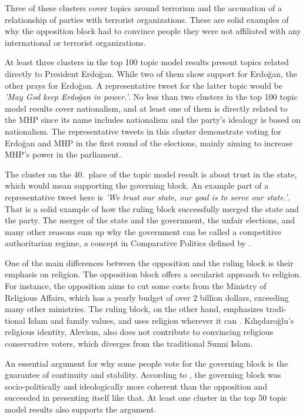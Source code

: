 Three of these clusters cover topics around terrorism and the accusation of a relationship of parties 
with terrorist organizations. These are solid examples of why the opposition block had to convince 
people they were not affiliated with any international or terrorist organizations. 

At least three clusters in the top 100 topic model results present topics related directly to 
President Erdo­ğan. While two of them show support for Erdo­ğan, the other prays for Erdo­ğan. A 
representative tweet for the latter topic would be \textit{'May God keep Erdo­ğan in power.'}. No 
less than two clusters in the top 100 topic model results cover nationalism, and at least one of them 
is directly related to the \ac{MHP} since its name includes nationalism and the party's idealogy is based on nationalism. 
The representative tweets 
in this cluster demonstrate voting for Erdo­ğan and \ac{MHP} in the first round of the elections, 
mainly aiming to increase \ac{MHP}'s power in the parliament.

The cluster on the 40.\ place of the topic model result is about trust in the state, which would 
mean supporting the governing block. An example part of a representative tweet here is 
\textit{'We trust our state, our goal is to serve our state.'}. That is a solid example of how the 
ruling block successfully merged the state and the party. The merger of the state and the government, 
the unfair elections, and many other reasons sum up why the government can be called a competitive 
authoritarian regime, a concept in Comparative Politics defined by \textcite{levitsky_elections_2002}.

One of the main differences between the opposition and the ruling block is their emphasis on 
religion. The opposition block offers a secularist approach to religion. For instance, the opposition 
aims to cut some costs from the Ministry of Religious Affairs, which has a yearly budget of over 
2 billion dollars, exceeding many other ministries. The ruling block, on the other hand, emphasizes 
tradi­tional Islam and family values, and uses religion wherever it can 
\parencite{cevik_aksoy_aydin_turkey_after_elections_2023}. Kılıçdaroğlu's religious identity, 
Alevism, also does not contribute to convincing religious conservative voters, which diverges 
from the traditional Sunni Islam.

An essential argument for why some people vote for the governing block is the guarantee of continuity 
and stability. According to \textcite{cevik_aksoy_aydin_turkey_after_elections_2023}, the governing 
block was socio-politically and ideologically more coherent than the oppo­sition and succeeded 
in presenting itself like that. At least one cluster in the top 50 topic model results also 
supports the argument.

